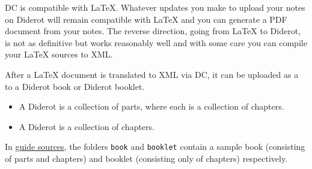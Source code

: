 DC is compatible with LaTeX. Whatever updates you make to upload your notes on Diderot will remain compatible with LaTeX and  you can generate a PDF document from your notes.
%
The reverse direction, going from LaTeX to Diderot, is not as
definitive but works reasonably well and with some care you can
compile your LaTeX sources to XML.
%


\begin{definition}
After a LaTeX document is translated to XML via DC, it can be uploaded as a  to a Diderot book or Diderot booklet.  
%

\begin{itemize}
\item
A Diderot  is a collection of parts, where each  is a collection of chapters.

\item
A Diderot  is a collection of chapters. 
\end{itemize}
\end{definition}

\begin{example}
In
\href{https://github.com/diderot-edu/diderot-guide}{guide sources},
%
the folders \lstinline`book` and \lstinline`booklet` contain a sample book (consisting of parts and chapters) and booklet (consisting only of chapters) respectively.
\end{example}






